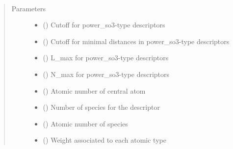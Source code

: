\documentclass[letterpaper,10pt,english]{sphinxmanual}
\begin{document}

\begin{fulllineitems}
\label{\detokenize{descriptors:gap.descriptors.power_so3}}~\begin{quote}\begin{description}
\item[{Parameters}] \leavevmode\begin{itemize}
\item {} 
 () \textendash{} Cutoff for power\_so3-type descriptors

\item {} 
 () \textendash{} Cutoff for minimal distances in power\_so3-type descriptors

\item {} 
 () \textendash{} L\_max for power\_so3-type descriptors

\item {} 
 () \textendash{} N\_max for power\_so3-type descriptors

\item {} 
 () \textendash{} Atomic number of central atom

\item {} 
 () \textendash{} Number of species for the descriptor

\item {} 
 (\sphinxstyleliteralemphasis{\sphinxupquote{)}}) \textendash{} Atomic number of species

\item {} 
 (\sphinxstyleliteralemphasis{\sphinxupquote{) }}) \textendash{} Weight associated to each atomic type

\end{itemize}

\end{description}\end{quote}

\end{fulllineitems}
\end{document}

